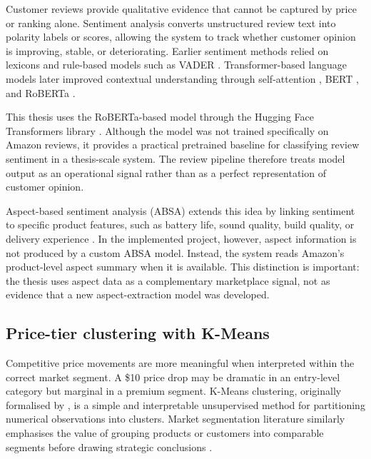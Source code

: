 Customer reviews provide qualitative evidence that cannot be captured by
price or ranking alone. Sentiment analysis converts unstructured review
text into polarity labels or scores, allowing the system to track whether
customer opinion is improving, stable, or deteriorating. Earlier
sentiment methods relied on lexicons and rule-based models such as VADER
\citep{hutto2014vader}. Transformer-based language models later
improved contextual understanding through self-attention
\citep{vaswani2017attention}, BERT \citep{devlin2019bert}, and RoBERTa
\citep{liu2019roberta}.

This thesis uses the RoBERTa-based model
{\texttt{}} through the
Hugging Face Transformers library \citep{wolf2020transformers,
loureiro2022timelms, cardiffnlp2026model}. Although the model was not
trained specifically on Amazon reviews, it provides a practical
pretrained baseline for classifying review sentiment in a thesis-scale
system. The review pipeline therefore treats model output as an
operational signal rather than as a perfect representation of customer
opinion.

Aspect-based sentiment analysis (ABSA) extends this idea by linking
sentiment to specific product features, such as battery life, sound
quality, build quality, or delivery experience \citep{hu2004mining,
pontiki2014semeval, zhang2022survey}. In the implemented project,
however, aspect information is not produced by a custom ABSA model.
Instead, the system reads Amazon's product-level aspect summary when it
is available. This distinction is important: the thesis uses aspect data
as a complementary marketplace signal, not as evidence that a new
aspect-extraction model was developed.

\subsection{Price-tier clustering with K-Means}

Competitive price movements are more meaningful when interpreted within
the correct market segment. A \$10 price drop may be dramatic in an
entry-level category but marginal in a premium segment. K-Means
clustering, originally formalised by \citet{macqueen1967kmeans}, is a
simple and interpretable unsupervised method for partitioning numerical
observations into clusters. Market segmentation literature similarly
emphasises the value of grouping products or customers into comparable
segments before drawing strategic conclusions \citep{wedel2000marketSegmentation}.


